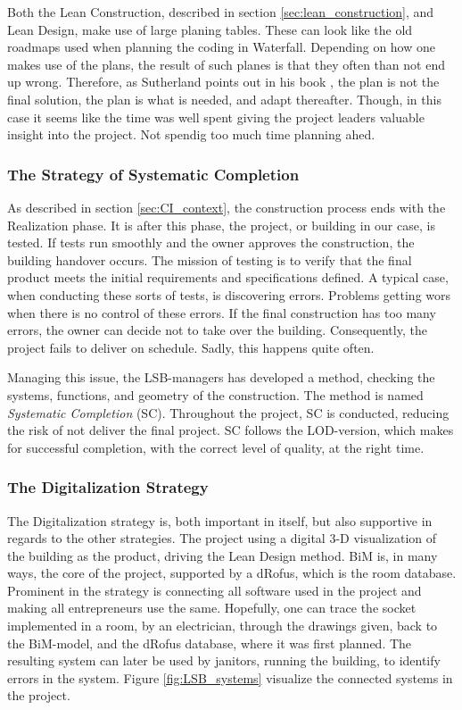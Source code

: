 Both the Lean Construction, described in section \ref{sec:lean_construction}, and Lean Design, make use of large planing tables. These can look like the old roadmaps used when planning the coding in Waterfall. Depending on how one makes use of the plans, the result of such planes is that they often than not end up wrong. Therefore, as Sutherland points out in his book \cite{sutherland}, the plan is not the final solution, the plan is what is needed, and adapt thereafter. Though, in this case it seems like the time was well spent giving the project leaders valuable insight into the project. Not spendig too much time planning ahed. 

\subsubsection*{The Strategy of Systematic Completion}
As described in section \ref{sec:CI_context}, the construction process ends with the Realization phase. It is after this phase, the project, or building in our case, is tested. If tests run smoothly and the owner approves the construction, the building handover occurs. The mission of testing is to verify that the final product meets the initial requirements and specifications defined. A typical case, when conducting these sorts of tests, is discovering errors. Problems getting wors when there is no control of these errors. If the final construction has too many errors, the owner can decide not to take over the building. Consequently, the project fails to deliver on schedule. Sadly, this happens quite often.

Managing this issue, the LSB-managers has developed a method, checking the systems, functions, and geometry of the construction. The method is named \textit{Systematic Completion} (SC). Throughout the project, SC is conducted, reducing the risk of not deliver the final project. SC follows the LOD-version, which makes for successful completion, with the correct level of quality, at the right time.

\subsubsection*{The Digitalization Strategy}
The Digitalization strategy is, both important in itself, but also supportive in regards to the other strategies. The project using a digital 3-D visualization of the building as the product, driving the Lean Design method. BiM is, in many ways, the core of the project, supported by a dRofus, which is the room database. Prominent in the strategy is connecting all software used in the project and making all entrepreneurs use the same. Hopefully, one can trace the socket implemented in a room, by an electrician, through the drawings given, back to the BiM-model, and the dRofus database, where it was first planned. The resulting system can later be used by janitors, running the building, to identify errors in the system.  Figure \ref{fig:LSB_systems} visualize the connected systems in the project.


